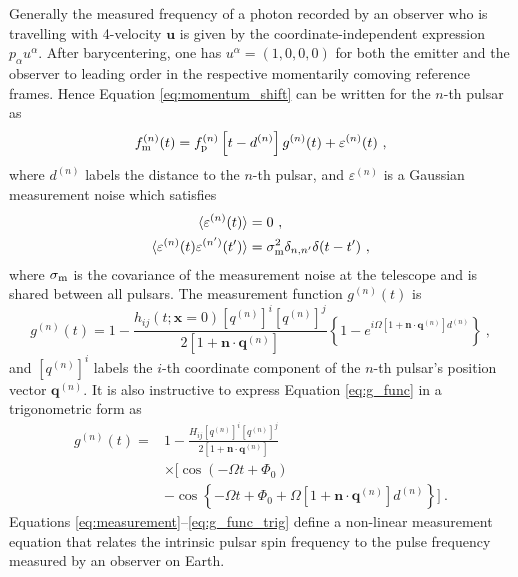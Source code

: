 \documentclass[fleqn,usenatbib,useAMS]{mnras}
\begin{document}
Generally the measured frequency of a photon recorded by an observer who is travelling with 4-velocity $\boldsymbol{u}$ is given by the coordinate-independent expression $p_{\alpha} u^{\alpha}$. After barycentering, one has $u^{\alpha} =(1,0,0,0)$ for both the emitter and the observer to leading order in the respective momentarily comoving reference frames. Hence Equation \eqref{eq:momentum_shift} can be written for the $n$-th pulsar as
\begin{equation}
	f_{\rm m}^{(n)}(t) = f_{\rm p}^{(n)}\left [t-d^{(n)} \right ] g^{(n)}(t) +  \varepsilon^{(n)}(t)\ ,
	\label{eq:measurement}
\end{equation}
where $d^{(n)}$ labels the distance to the $n$-th pulsar, and $\varepsilon^{(n)}$ is a Gaussian measurement noise which satisfies 
\begin{align}
	\langle \varepsilon^{(n)}(t) \rangle &= 0 \ , \\
	\langle \varepsilon^{(n)}(t) \varepsilon^{(n')}(t') \rangle &= \sigma_{\rm m}^2 \delta_{n,n'} \delta(t - t') \ ,	\label{eq:vareps}
\end{align}
where $\sigma_{\rm m}$ is the covariance of the measurement noise at the telescope and is shared between all pulsars. The measurement function $g^{(n)}(t)$ is
\begin{equation}
	g^{(n)}(t) = 1 - \frac{h_{ij} (t; \boldsymbol{x}= 0)[q^{(n)}]^i [q^{(n)}]^j}{2[1 + \boldsymbol{n}\cdot \boldsymbol{q}^{(n)}] }  \left \{1 -e^{i \Omega \left[1 + \boldsymbol{n}\cdot \boldsymbol{q}^{(n)} \right]  d^{(n)}}\right \} \ ,
	\label{eq:g_func}
\end{equation}
and $[q^{(n)}]^i$ labels the $i$-th coordinate component of the $n$-th pulsar's position vector $\boldsymbol{q}^{(n)}$. It is also instructive to express Equation \eqref{eq:g_func} in a trigonometric form as
\begin{align}
	g^{(n)}(t) =& 1 - \frac{ H_{ij}[q^{(n)}]^i [q^{(n)}]^j }{2 [1 + \boldsymbol{n}\cdot \boldsymbol{q}^{(n)}] } \nonumber \\
	& \times \Big[\cos\left(-\Omega t +\Phi_0\right) \nonumber \\
	&- \cos \left \{-\Omega t +\Phi_0 + \Omega \left[1 + \boldsymbol{n}\cdot \boldsymbol{q}^{(n)} \right]  d^{(n)} \right \} \Big ] \ .
	\label{eq:g_func_trig}
\end{align}
Equations \eqref{eq:measurement}--\eqref{eq:g_func_trig}  define a non-linear measurement equation that relates the intrinsic pulsar spin frequency to the pulse frequency measured by an observer on Earth. 
\end{document}
